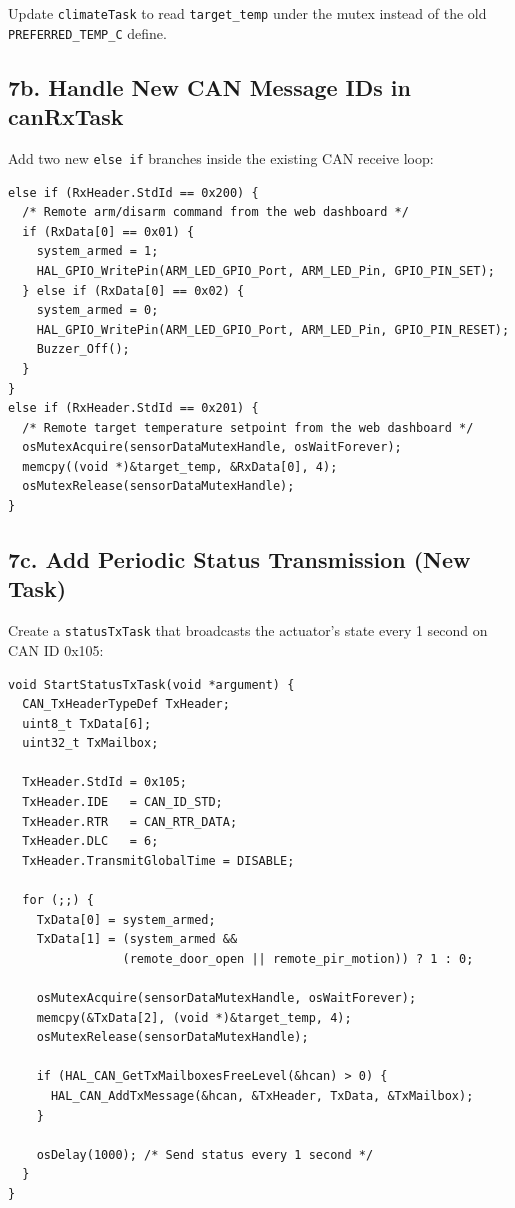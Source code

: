 \documentclass[11pt,a4paper]{article}
\begin{document}
Update \texttt{climateTask} to read \texttt{target\_temp} under the mutex instead of the old \texttt{PREFERRED\_TEMP\_C} define.

\subsection{7b. Handle New CAN Message IDs in canRxTask}

Add two new \texttt{else if} branches inside the existing CAN receive loop:

\begin{lstlisting}
else if (RxHeader.StdId == 0x200) {
  /* Remote arm/disarm command from the web dashboard */
  if (RxData[0] == 0x01) {
    system_armed = 1;
    HAL_GPIO_WritePin(ARM_LED_GPIO_Port, ARM_LED_Pin, GPIO_PIN_SET);
  } else if (RxData[0] == 0x02) {
    system_armed = 0;
    HAL_GPIO_WritePin(ARM_LED_GPIO_Port, ARM_LED_Pin, GPIO_PIN_RESET);
    Buzzer_Off();
  }
}
else if (RxHeader.StdId == 0x201) {
  /* Remote target temperature setpoint from the web dashboard */
  osMutexAcquire(sensorDataMutexHandle, osWaitForever);
  memcpy((void *)&target_temp, &RxData[0], 4);
  osMutexRelease(sensorDataMutexHandle);
}
\end{lstlisting}

\subsection{7c. Add Periodic Status Transmission (New Task)}

Create a \texttt{statusTxTask} that broadcasts the actuator's state every 1 second on CAN ID 0x105:

\begin{lstlisting}
void StartStatusTxTask(void *argument) {
  CAN_TxHeaderTypeDef TxHeader;
  uint8_t TxData[6];
  uint32_t TxMailbox;

  TxHeader.StdId = 0x105;
  TxHeader.IDE   = CAN_ID_STD;
  TxHeader.RTR   = CAN_RTR_DATA;
  TxHeader.DLC   = 6;
  TxHeader.TransmitGlobalTime = DISABLE;

  for (;;) {
    TxData[0] = system_armed;
    TxData[1] = (system_armed &&
                (remote_door_open || remote_pir_motion)) ? 1 : 0;

    osMutexAcquire(sensorDataMutexHandle, osWaitForever);
    memcpy(&TxData[2], (void *)&target_temp, 4);
    osMutexRelease(sensorDataMutexHandle);

    if (HAL_CAN_GetTxMailboxesFreeLevel(&hcan) > 0) {
      HAL_CAN_AddTxMessage(&hcan, &TxHeader, TxData, &TxMailbox);
    }

    osDelay(1000); /* Send status every 1 second */
  }
}
\end{lstlisting}
\end{document}
